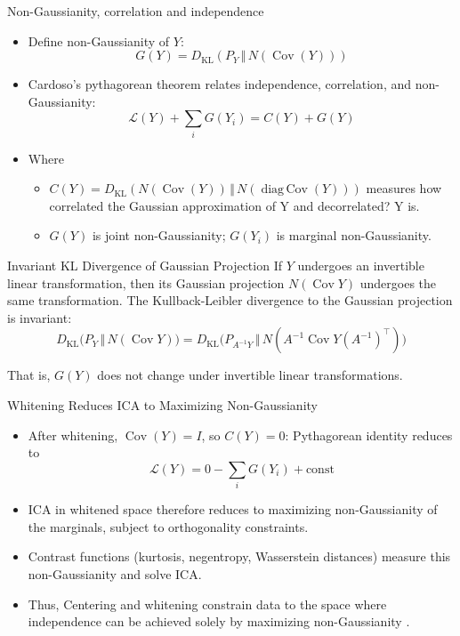 \documentclass{beamer}
\begin{document}
\begin{frame}{Non-Gaussianity, correlation and independence}
  \begin{itemize}
    \item Define non-Gaussianity of \(Y\):
      \[
        G(Y) = D_{\mathrm{KL}}(P_Y \,\Vert\, N(\operatorname{Cov}(Y)))
      \]
    \item Cardoso's pythagorean theorem relates independence, correlation, and non-Gaussianity:
      \[
        \mathscr{L}(Y) + \sum_{i} G(Y_i) = C(Y) + G(Y)
      \]
    \item Where
      \begin{itemize}
        \item \(C(Y) = D_{\mathrm{KL}}(N(\operatorname{Cov}(Y)) \,\Vert\, N(\operatorname{diag\,Cov}(Y)))\) measures how correlated the Gaussian approximation of Y and decorrelated? Y is.
        \item \(G(Y)\) is joint non-Gaussianity; \(G(Y_i)\) is marginal non-Gaussianity.
      \end{itemize}
  \end{itemize}
\end{frame}

\begin{frame}{Invariant KL Divergence of Gaussian Projection}
    If $Y$ undergoes an invertible linear transformation, then its Gaussian projection $N(\operatorname{Cov}Y)$ undergoes the same transformation.
    The Kullback-Leibler divergence to the Gaussian projection is invariant:
    \[
      D_{\mathrm{KL}}\big(P_Y \,\Vert\, N(\operatorname{Cov}Y)\big)
      = D_{\mathrm{KL}}\big(P_{A^{-1}Y} \,\Vert\, N(A^{-1} \operatorname{Cov}Y (A^{-1})^\top)\big)
    \]
    
    That is, $G(Y)$ does not change under invertible linear transformations.
\end{frame}


\begin{frame}{Whitening Reduces ICA to Maximizing Non-Gaussianity}
  \begin{itemize}
    \item After whitening, \(\operatorname{Cov}(Y) = I\), so \(C(Y) = 0\): Pythagorean identity reduces to
      \[
        \mathscr{L}(Y) = 0 - \sum_{i} G(Y_i) + \text{const}
      \]
    \item ICA in whitened space therefore reduces to maximizing non-Gaussianity of the marginals, subject to orthogonality constraints.
    \item Contrast functions (kurtosis, negentropy, Wasserstein distances) measure this non-Gaussianity and solve ICA.
    \item Thus, Centering and whitening constrain data to the space where independence can be achieved solely by maximizing non-Gaussianity \cite{cardoso2022}.
  \end{itemize}
\end{frame}
\end{document}
